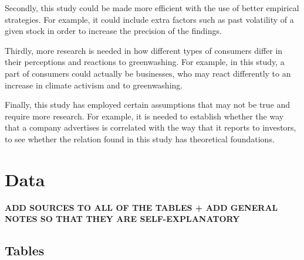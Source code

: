 \documentclass[12pt]{article}
\begin{document}
Secondly, this study could be made more efficient with the use of better empirical strategies. For example, it could include extra factors such as past volatility of a given stock in order to increase the precision of the findings. 

Thirdly, more research is needed in how different types of consumers differ in their perceptions and reactions to greenwashing. For example, in this study, a part of consumers could actually be businesses, who may react differently to an increase in climate activism and to greenwashing. 

Finally, this study has employed certain assumptions that may not be true and require more research. For example, it is needed to establish whether the way that a company advertises is correlated with the way that it reports to investors, to see whether the relation found in this study has theoretical foundations. 



\pagebreak
\printbibliography{}
\pagebreak
\appendix

\section{Data}\label{app:data}

\textbf{ADD SOURCES TO ALL OF THE TABLES + ADD GENERAL NOTES SO THAT THEY ARE SELF-EXPLANATORY}

\subsection{Tables}\label{app:data:tabs}
\small
\centering
\end{document}
